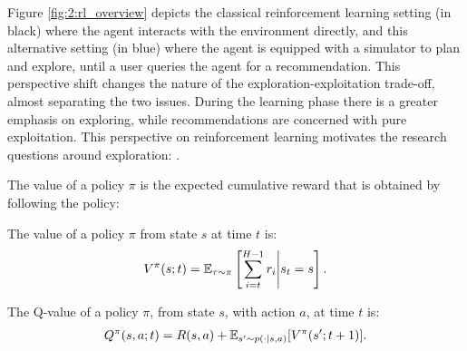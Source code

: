     Figure \ref{fig:2:rl_overview} depicts the classical reinforcement learning setting (in black) where the agent interacts with the environment directly, and this alternative setting (in blue) where the agent is equipped with a simulator to plan and explore, until a user queries the agent for a recommendation. This perspective shift changes the nature of the exploration-exploitation trade-off, almost separating the two issues. During the learning phase there is a greater emphasis on exploring, while recommendations are concerned with pure exploitation. This perspective on reinforcement learning motivates the research questions around exploration: \exploreq. 


    The value of a policy $\pi$ is the expected cumulative reward that is obtained by following the policy:
    \begin{defn}
        \label{def:2:value}
        \label{def:2:q_value}
        The \textnormal{value} of a policy $\pi$ from state $s$ at time $t$ is:
        \begin{align}
            V^{\pi}(s;t) = \mathbb{E}_{\tau\sim\pi}\left[\sum_{i=t}^{H-1} r_i \Bigg| s_t=s \right]. \label{eq:2:value_fn_def}
        \end{align} 

        The \textnormal{Q-value} of a policy $\pi$, from state $s$, with action $a$, at time $t$ is:
        \begin{align}
            Q^{\pi}(s,a;t) = R(s,a) + \mathbb{E}_{s'\sim p(\cdot|s,a)} [V^{\pi}(s';t+1)]. \label{eq:2:q_value_fn_def}
        \end{align} 
    \end{defn}

